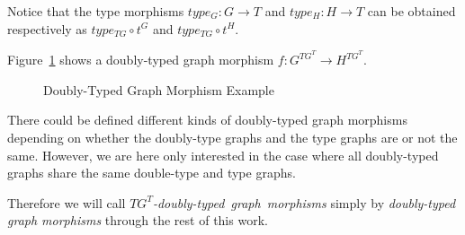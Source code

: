 Notice that the type morphisms $type_G : G \rightarrow T$ and $type_H : H \rightarrow T$ can be obtained respectively as $type_{TG} \circ t^G$ and $type_{TG} \circ t^H$.

\begin{example} Figure~\ref{fig:process:doubly-typed-graph-morphism} shows a doubly-typed graph morphism $f : G^{TG^T} \rightarrow H^{TG^T}$.

\begin{figure}[!ht]
  \centering
  \caption{Doubly-Typed Graph Morphism Example}\label{fig:process:doubly-typed-graph-morphism}
\end{figure}
\end{example}

\begin{remark} There could be defined different kinds of doubly-typed graph morphisms depending on whether the doubly-type graphs and the type graphs are or not the same. However, we are here only interested in the case where all doubly-typed graphs share the same double-type and type graphs.

Therefore we will call \mbox{\emph{$TG^T$-doubly-typed graph morphisms}} simply by \emph{doubly-typed graph morphisms} through the rest of this work.

\end{remark}


